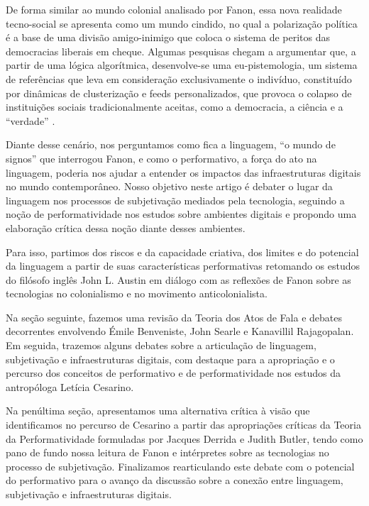 \documentclass[portuguese]{textolivre}
\begin{document}
De forma similar ao mundo colonial analisado por Fanon, essa nova realidade tecno-social se apresenta como um mundo cindido, no qual a polarização política é a base de uma divisão amigo-inimigo que coloca o sistema de peritos das democracias liberais em cheque. Algumas pesquisas chegam a argumentar que, a partir de uma lógica algorítmica, desenvolve-se uma eu-pistemologia, um sistema de referências que leva em consideração exclusivamente o indivíduo, constituído por dinâmicas de clusterização e feeds personalizados, que provoca o colapso de instituições sociais tradicionalmente aceitas, como a democracia, a ciência e a “verdade” \cite{cesarino2021b}.

Diante desse cenário, nos perguntamos como fica a linguagem, “o mundo de signos” que interrogou Fanon, e como o performativo, a força do ato na linguagem, poderia nos ajudar a entender os impactos das infraestruturas digitais no mundo contemporâneo. Nosso objetivo neste artigo é debater o lugar da linguagem nos processos de subjetivação mediados pela tecnologia, seguindo a noção de performatividade nos estudos sobre ambientes digitais e propondo uma elaboração crítica dessa noção diante desses ambientes.

Para isso, partimos dos riscos e da capacidade criativa, dos limites e do potencial da linguagem a partir de suas características performativas retomando os estudos do filósofo inglês John L. Austin em diálogo com as reflexões de Fanon sobre as tecnologias no colonialismo e no movimento anticolonialista.

Na seção seguinte, fazemos uma revisão da Teoria dos Atos de Fala e debates decorrentes envolvendo Émile Benveniste, John Searle e Kanavillil Rajagopalan. Em seguida, trazemos alguns debates sobre a articulação de linguagem, subjetivação e infraestruturas digitais, com destaque para a apropriação e o percurso dos conceitos de performativo e de performatividade nos estudos da antropóloga Letícia Cesarino.

Na penúltima seção, apresentamos uma alternativa crítica à visão que identificamos no percurso de Cesarino a partir das apropriações críticas da Teoria da Performatividade formuladas por Jacques Derrida e Judith Butler, tendo como pano de fundo nossa leitura de Fanon e intérpretes sobre as tecnologias no processo de subjetivação. Finalizamos rearticulando este debate com o potencial do performativo para o avanço da discussão sobre a conexão entre linguagem, subjetivação e infraestruturas digitais.
\end{document}
